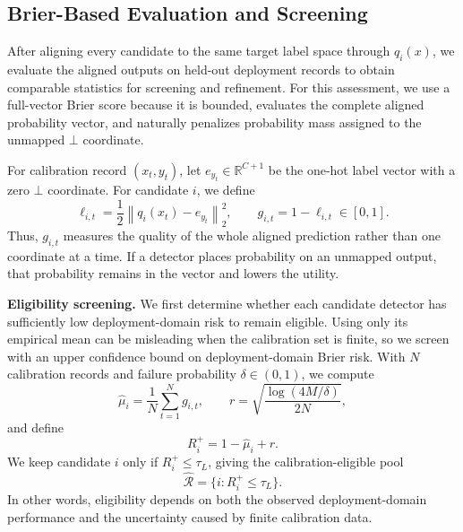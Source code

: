 \documentclass[conference]{IEEEtran}
\theoremstyle{definition}
\newcommand{\bheading}[1]{\noindent\textbf{#1.}\xspace}
\begin{document}
\subsection{Brier-Based Evaluation and Screening}

After aligning every candidate to the same target label space through $q_i(x)$, we evaluate the aligned outputs on held-out deployment records to obtain comparable statistics for screening and refinement.
For this assessment, we use a full-vector Brier score because it is bounded, evaluates the complete aligned probability vector, and naturally penalizes probability mass assigned to the unmapped $\bot$ coordinate.

For calibration record $(x_t,y_t)$, let $e_{y_t}\in\mathbb R^{C+1}$ be the one-hot label vector with a zero $\bot$ coordinate.
For candidate $i$, we define
\begin{equation}
\ell_{i,t}=\frac12\left\|q_i(x_t)-e_{y_t}\right\|_2^2,
\qquad
g_{i,t}=1-\ell_{i,t}\in[0,1].
\label{eq:brier_utility}
\end{equation}
Thus, $g_{i,t}$ measures the quality of the whole aligned prediction rather than one coordinate at a time.
If a detector places probability on an unmapped output, that probability remains in the vector and lowers the utility.

\bheading{Eligibility screening}
We first determine whether each candidate detector has sufficiently low deployment-domain risk to remain eligible.
Using only its empirical mean can be misleading when the calibration set is finite, so we screen with an upper confidence bound on deployment-domain Brier risk.
With $N$ calibration records and failure probability $\delta\in(0,1)$, we compute
\begin{equation}
\widehat\mu_i=\frac1N\sum_{t=1}^{N}g_{i,t},
\qquad
r=\sqrt{\frac{\log(4M/\delta)}{2N}},
\label{eq:overall_calibration}
\end{equation}
and define
\begin{equation}
R_i^+=1-\widehat\mu_i+r.
\label{eq:risk_gate}
\end{equation}
We keep candidate $i$ only if $R_i^+\le\tau_L$, giving the calibration-eligible pool
\begin{equation}
\widehat{\mathcal R}=\{i:R_i^+\le\tau_L\}.
\label{eq:eligible_pool}
\end{equation}
In other words, eligibility depends on both the observed deployment-domain performance and the uncertainty caused by finite calibration data.
\end{document}
